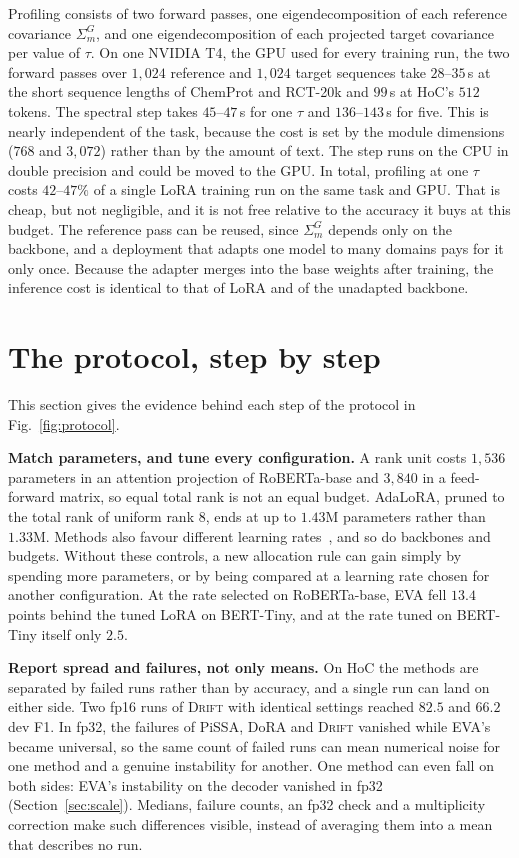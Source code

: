 \documentclass[conference,onecolumn]{IEEEtran}
\newcommand{\method}{\textsc{Drift}}
\begin{document}
Profiling consists of two forward passes, one eigendecomposition of each
reference covariance $\Sigma^{G}_m$, and one eigendecomposition of each projected
target covariance per value of $\tau$. On one NVIDIA T4, the GPU used for every
training run, the two forward passes over
$1{,}024$ reference and $1{,}024$ target sequences take $28$--$35$\,s at the
short sequence lengths of ChemProt and RCT-20k and $99$\,s at HoC's $512$
tokens. The spectral step takes $45$--$47$\,s for one $\tau$ and $136$--$143$\,s
for five. This is nearly independent of the task, because the cost is set by
the module dimensions ($768$ and $3{,}072$) rather than by the amount of text.
The step runs on the CPU in double precision and could be moved to the GPU. In
total, profiling at one $\tau$ costs $42$--$47\%$ of a single LoRA training run
on the same task and GPU. That is cheap, but not negligible, and it is not free
relative to the accuracy it buys at this budget. The reference pass can be
reused, since $\Sigma^{G}_m$ depends only on the backbone, and a deployment that
adapts one model to many domains pays for it only once. Because the adapter
merges into the base weights after training, the inference cost is identical to
that of LoRA and of the unadapted backbone.

\section{The protocol, step by step}
\label{sup:protocol}
This section gives the evidence behind each step of the protocol in Fig.~\ref{fig:protocol}.

\noindent\textbf{Match parameters, and tune every configuration.} A rank unit
costs $1{,}536$ parameters in an attention projection of RoBERTa-base and
$3{,}840$ in a feed-forward matrix, so equal total rank is not an equal budget.
AdaLoRA, pruned to the total rank of uniform rank $8$, ends at up to $1.43$M
parameters rather than $1.33$M. Methods also favour different learning
rates~\cite{lee2026lrmatters}, and so do backbones and budgets. Without these
controls, a new allocation rule can gain simply by spending more parameters, or
by being compared at a learning rate chosen for another configuration. At the
rate selected on RoBERTa-base, EVA fell $13.4$ points behind the tuned LoRA on
BERT-Tiny, and at the rate tuned on BERT-Tiny itself only $2.5$.

\noindent\textbf{Report spread and failures, not only means.} On HoC the methods
are separated by failed runs rather than by accuracy, and a single run can land
on either side. Two fp16 runs of \method{} with identical settings reached $82.5$
and $66.2$ dev F1. In fp32, the failures of PiSSA, DoRA and \method{} vanished
while EVA's became universal, so the same count of failed runs can mean
numerical noise for one method and a genuine instability for another. One
method can even fall on both sides: EVA's instability on the decoder vanished in
fp32 (Section~\ref{sec:scale}). Medians,
failure counts, an fp32 check and a multiplicity correction make such
differences visible, instead of averaging them into a mean that describes no
run.
\end{document}

